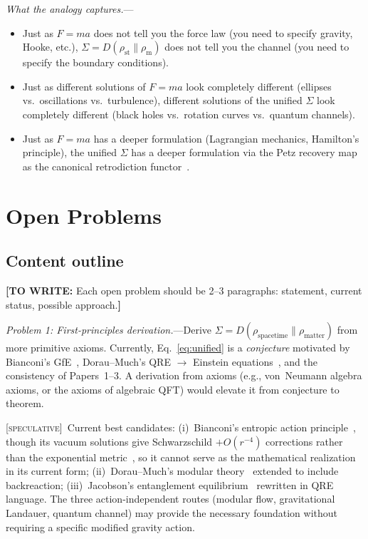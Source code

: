 \documentclass[prl,twocolumn,superscriptaddress,longbibliography,floatfix]{revtex4-2}
\newcommand{\spec}{\textsc{[speculative]}}
\newcommand{\towrite}[1]{{\color{blue}\textbf{[TO WRITE:} #1\textbf{]}}}
\begin{document}
\emph{What the analogy captures.}---
\begin{itemize}
\item Just as $F = ma$ does not tell you the force law (you
  need to specify gravity, Hooke, etc.), $\Sigma = D(\rho_{\mathrm{st}}
  \| \rho_{\mathrm{m}})$ does not tell you the channel (you need
  to specify the boundary conditions).
\item Just as different solutions of $F = ma$ look completely
  different (ellipses vs.\ oscillations vs.\ turbulence), different
  solutions of the unified $\Sigma$ look completely different
  (black holes vs.\ rotation curves vs.\ quantum channels).
\item Just as $F = ma$ has a deeper formulation (Lagrangian
  mechanics, Hamilton's principle), the unified $\Sigma$ has
  a deeper formulation via the Petz recovery map as the canonical
  retrodiction functor~\cite{Parzygnat2023}.
\end{itemize}

\section{Open Problems}
\label{sec:open}

\subsection*{Content outline}

\towrite{Each open problem should be 2--3 paragraphs: statement,
current status, possible approach.}

\emph{Problem 1: First-principles derivation.}---Derive
$\Sigma = D(\rho_{\mathrm{spacetime}} \| \rho_{\mathrm{matter}})$
from more primitive axioms. Currently, Eq.~\eqref{eq:unified} is
a \emph{conjecture} motivated by Bianconi's GfE~\cite{Bianconi2025},
Dorau--Much's QRE $\to$ Einstein equations~\cite{DorauMuch2025},
and the consistency of Papers~1--3. A derivation from axioms
(e.g., von~Neumann algebra axioms, or the axioms of algebraic
QFT) would elevate it from conjecture to theorem.

\spec\ Current best candidates: (i)~Bianconi's entropic action
principle~\cite{Bianconi2025}, though its vacuum solutions give
Schwarzschild $+ O(r^{-4})$ corrections rather than the exponential
metric~\cite{Thattarampilly2026}, so it cannot serve as the
mathematical realization in its current form;
(ii)~Dorau--Much's modular
theory~\cite{DorauMuch2025} extended to include backreaction;
(iii)~Jacobson's entanglement equilibrium~\cite{Jacobson2016}
rewritten in QRE language. The three action-independent routes
(modular flow, gravitational Landauer, quantum channel) may
provide the necessary foundation without requiring a specific
modified gravity action.
\end{document}
